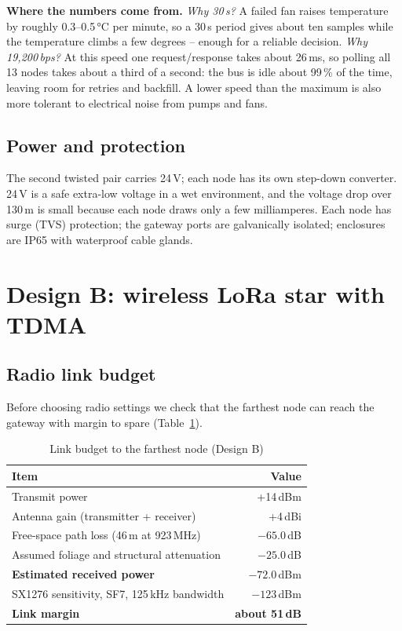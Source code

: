 \documentclass[11pt,a4paper]{report}
\newcommand{\why}[1]{\par\noindent\colorbox{gray!10}{\parbox{\dimexpr\linewidth-2\fboxsep}{\small\textbf{Where the numbers come from.} #1}}\par}
\begin{document}
\why{\emph{Why 30\,s?} A failed fan raises temperature by roughly 0.3--0.5\,°C per minute, so a 30\,s period gives about ten samples while the temperature climbs a few degrees -- enough for a reliable decision. \emph{Why 19{,}200\,bps?} At this speed one request/response takes about 26\,ms, so polling all 13 nodes takes about a third of a second: the bus is idle about 99\,\% of the time, leaving room for retries and backfill. A lower speed than the maximum is also more tolerant to electrical noise from pumps and fans.}

\subsection{Power and protection}
The second twisted pair carries 24\,V; each node has its own step-down converter. 24\,V is a safe extra-low voltage in a wet environment, and the voltage drop over 130\,m is small because each node draws only a few milliamperes. Each node has surge (TVS) protection; the gateway ports are galvanically isolated; enclosures are IP65 with waterproof cable glands.

\section{Design B: wireless LoRa star with TDMA}
\subsection{Radio link budget}
Before choosing radio settings we check that the farthest node can reach the gateway with margin to spare (Table~\ref{tab:link}).

\begin{table}[htbp]
\centering
\caption{Link budget to the farthest node (Design B)}\label{tab:link}
\small
\begin{tabular}{l r}
\toprule
\textbf{Item} & \textbf{Value}\\
\midrule
Transmit power & +14\,dBm\\
Antenna gain (transmitter + receiver) & +4\,dBi\\
Free-space path loss (46\,m at 923\,MHz) & $-65.0$\,dB\\
Assumed foliage and structural attenuation \cite{camapinto,itur} & $-25.0$\,dB\\
\textbf{Estimated received power} & $\mathbf{-72.0}$\,dBm\\
SX1276 sensitivity, SF7, 125\,kHz bandwidth & $-123$\,dBm\\
\textbf{Link margin} & \textbf{about 51\,dB}\\
\bottomrule
\end{tabular}
\end{table}
\end{document}
